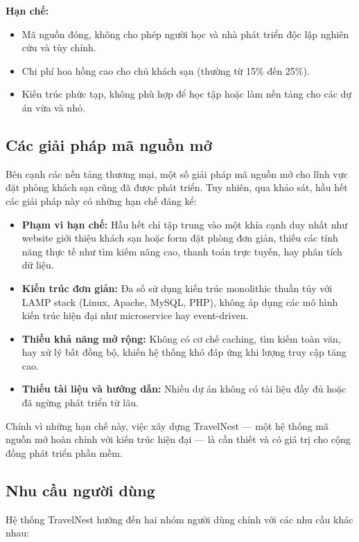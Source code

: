 \documentclass[13pt,a4paper,twoside]{report}
\begin{document}
\textbf{Hạn chế:}
\begin{itemize}
  \item Mã nguồn đóng, không cho phép người học và nhà phát triển độc lập nghiên cứu và tùy chỉnh.
  \item Chi phí hoa hồng cao cho chủ khách sạn (thường từ 15\% đến 25\%).
  \item Kiến trúc phức tạp, không phù hợp để học tập hoặc làm nền tảng cho các dự án vừa và nhỏ.
\end{itemize}

\subsection{Các giải pháp mã nguồn mở}

Bên cạnh các nền tảng thương mại, một số giải pháp mã nguồn mở cho lĩnh vực đặt phòng khách sạn cũng đã được phát triển. Tuy nhiên, qua khảo sát, hầu hết các giải pháp này có những hạn chế đáng kể:

\begin{itemize}
  \item \textbf{Phạm vi hạn chế:} Hầu hết chỉ tập trung vào một khía cạnh duy nhất như website giới thiệu khách sạn hoặc form đặt phòng đơn giản, thiếu các tính năng thực tế như tìm kiếm nâng cao, thanh toán trực tuyến, hay phân tích dữ liệu.
  \item \textbf{Kiến trúc đơn giản:} Đa số sử dụng kiến trúc monolithic thuần túy với LAMP stack (Linux, Apache, MySQL, PHP), không áp dụng các mô hình kiến trúc hiện đại như microservice hay event-driven.
  \item \textbf{Thiếu khả năng mở rộng:} Không có cơ chế caching, tìm kiếm toàn văn, hay xử lý bất đồng bộ, khiến hệ thống khó đáp ứng khi lượng truy cập tăng cao.
  \item \textbf{Thiếu tài liệu và hướng dẫn:} Nhiều dự án không có tài liệu đầy đủ hoặc đã ngừng phát triển từ lâu.
\end{itemize}

Chính vì những hạn chế này, việc xây dựng TravelNest --- một hệ thống mã nguồn mở hoàn chỉnh với kiến trúc hiện đại --- là cần thiết và có giá trị cho cộng đồng phát triển phần mềm.

\subsection{Nhu cầu người dùng}

Hệ thống TravelNest hướng đến hai nhóm người dùng chính với các nhu cầu khác nhau:
\end{document}
